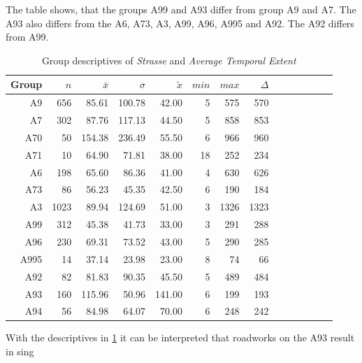 The table shows, that the groups A99 and A93 differ from group A9 and A7. The A93 also differs from the A6, A73, A3, A99, A96, A995 and A92. The A92 differs from A99.
\begin{table}[ht!]
	\tiny
	\centering
  \begin{tabular}{rrrrrrrrrrrrrr}
    \toprule
    Group & $n$ & $\bar{x}$ & $\sigma$ & $\tilde{x}$ & $min$ & $max$ & $\Delta$ \\
    \midrule
    A9   & 656  & 85.61  & 100.78 & 42.00  & 5  & 575  & 570 \\ 
    A7   & 302  & 87.76  & 117.13 & 44.50  & 5  & 858  & 853 \\ 
    A70  & 50   & 154.38 & 236.49 & 55.50  & 6  & 966  & 960 \\ 
    A71  & 10   & 64.90  & 71.81  & 38.00  & 18 & 252  & 234 \\ 
    A6   & 198  & 65.60  & 86.36  & 41.00  & 4  & 630  & 626 \\ 
    A73  & 86   & 56.23  & 45.35  & 42.50  & 6  & 190  & 184 \\ 
    A3   & 1023 & 89.94  & 124.69 & 51.00  & 3  & 1326 & 1323 \\ 
    A99  & 312  & 45.38  & 41.73  & 33.00  & 3  & 291  & 288 \\ 
    A96  & 230  & 69.31  & 73.52  & 43.00  & 5  & 290  & 285 \\ 
    A995 & 14   & 37.14  & 23.98  & 23.00  & 8  & 74   & 66 \\ 
    A92  & 82   & 81.83  & 90.35  & 45.50  & 5  & 489  & 484 \\ 
    A93  & 160  & 115.96 & 50.96  & 141.00 & 6  & 199  & 193 \\ 
    A94  & 56   & 84.98  & 64.07  & 70.00  & 6  & 248  & 242 \\ 
    \midrule
  \end{tabular}
	\caption{Group descriptives of \textit{Strasse} and \textit{Average Temporal Extent}}
	\label{tbl:descriptives_arbis_matched_Strasse_TAvg}
\end{table}
With the descriptives in \cref{tbl:descriptives_arbis_matched_Strasse_TAvg} it can be interpreted that roadworks on the A93 result in sing

